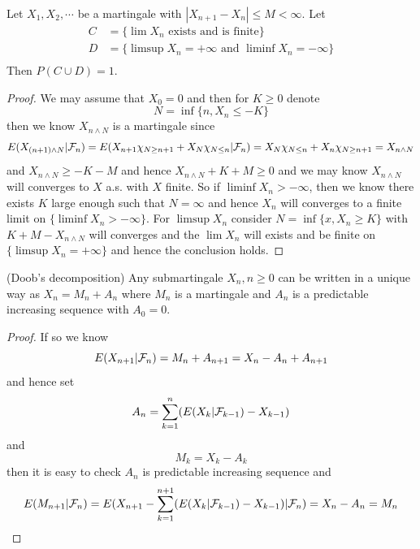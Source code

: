 \begin{theorem}
Let $X_1,X_2,\cdots$ be a martingale with $|X_{n+1}-X_n| \leq M < \infty$. Let
\[
\begin{aligned}
    C &= \{\lim X_n\text{ exists and is finite}\} \\
    D &= \{\limsup X_n = +\infty\text{ and }\liminf X_n = -\infty\} \\
\end{aligned}
\]
Then $P(C\cup D) = 1$.
\end{theorem}
\begin{proof}
    We may assume that $X_0 = 0$ and then for $K\geq 0$ denote
    \[
    N = \inf\{n,X_n \leq - K\}
    \]
    then we know $X_{n\wedge N}$ is a martingale since
    \[
    E(X_{(n+1)\wedge N}|\mathcal{F}_n) = E(X_{n+1}\chi_{N \geq n+1}+X_{N}\chi_{N\leq n}|\mathcal{F}_n) = X_{N}\chi_{N\leq n} + X_n\chi_{N\geq n+1} = X_{n\wedge N}
    \]
    and $X_{n\wedge N} \geq -K-M$ and hence $X_{n\wedge N} + K +M \geq 0$ and we may know $X_{n\wedge N}$ will converges to $X$ a.s. with $X$ finite. So if $\liminf X_n > -\infty$, then we know there exists $K$ large enough such that $N = \infty$ and hence $X_n$ will converges to a finite limit on $\{\liminf X_n > -\infty\}$. For $\limsup X_n$ consider $N = \inf\{x, X_n \geq K\}$ with $K+M - X_{n\wedge N}$ will converges and the $\lim X_n$ will exists and be finite on $\{\limsup X_n = +\infty\}$ and hence the conclusion holds.
\end{proof}

\begin{theorem}
    (Doob's decomposition) Any submartingale $X_n, n\geq 0$ can be written in a unique way as $X_n = M_n + A_n$ where $M_n$ is a martingale and $A_n$ is a predictable increasing sequence with $A_0 = 0$.    
\end{theorem}
\begin{proof}
    If so we know
    \[
    E(X_{n+1}|\mathcal{F}_n) = M_n + A_{n+1} = X_n - A_n + A_{n+1}
    \]
    and hence set
    \[
    A_n = \sum\limits_{k=1}^{n} (E(X_{k}|\mathcal{F}_{k-1})-X_{k-1})
    \]
    and
    \[
    M_k = X_k - A_k
    \]
    then it is easy to check $A_n$ is predictable increasing sequence and
    \[
    E(M_{n+1}|\mathcal{F}_n) = E(X_{n+1}-\sum\limits_{k=1}^{n+1} (E(X_{k}|\mathcal{F}_{k-1})-X_{k-1})|\mathcal{F}_n) = X_n - A_n
    = M_n
    \]
\end{proof}

